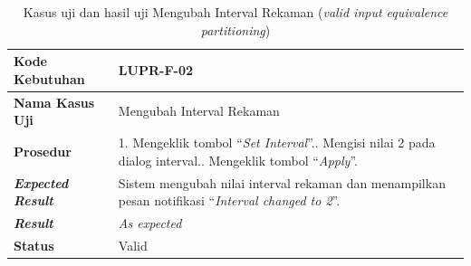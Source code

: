 \begin{longtable}{|L{3cm}|L{9cm}|}
  \caption{Kasus uji dan hasil uji Mengubah Interval Rekaman
  (\emph{valid input equivalence partitioning})}\label{tab:val-set-interval-ep-1} \\
  \hline
  \textbf{Kode Kebutuhan} & LUPR-F-02 \\\hline
  \textbf{Nama Kasus Uji} & Mengubah Interval Rekaman \\\hline
  \textbf{Prosedur} & 1. Mengeklik tombol ``\emph{Set Interval}''.. Mengisi nilai 2 pada dialog interval.. Mengeklik tombol ``\emph{Apply}''.\\\hline
  \textbf{\emph{Expected Result}} & Sistem mengubah nilai interval rekaman dan menampilkan pesan
                                    notifikasi ``\emph{Interval changed to 2}''. \\\hline
  \textbf{\emph{Result}} & \emph{As expected} \\\hline
  \textbf{Status} & Valid\\\hline
\end{longtable}

